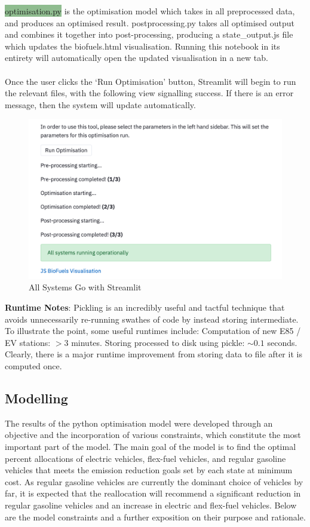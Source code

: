 \documentclass[answers]{exam}
\begin{document}
\begin{outline}
\2 \colorbox{darkseagreen}{optimisation.py} is the optimisation model which takes in all preprocessed data, and produces an optimised result.
\2 \colorbox{babyblue}{postprocessing.py} takes all optimised output and combines it together into post-processing, producing a \colorbox{mediumlavendermagenta}{state\_output.js} file which updates the \colorbox{lilac}{biofuels.html} visualisation. Running this notebook in its entirety will automatically open the updated visualisation in a new tab.
\\ ~\\
Once the user clicks the `Run Optimisation' button, Streamlit will begin to run the relevant files, with the following view signalling success. If there is an error message, then the system will update automatically.
\begin{figure}[h]
    \centering
    \includegraphics[scale=0.4]{systems.png}
    \caption{All Systems Go with Streamlit}
    \label{fig:my_label}
\end{figure}
\0 \textbf{Runtime Notes}: 
\2 Pickling is an incredibly useful and tactful technique that avoids unnecessarily re-running swathes of code by instead storing intermediate. To illustrate the point, some useful runtimes include:
\3 Computation of new E85 / EV stations: $>3$ minutes.
\3 Storing processed to disk using pickle: $\sim0.1$ seconds.
\2 Clearly, there is a major runtime improvement from storing data to file after it is computed once. 
\end{outline}
\subsection{Modelling}
The results of the python optimisation model were developed through an objective and the incorporation of various constraints, which constitute the most important part of the model. The main goal of the model is to find the optimal percent allocations of electric vehicles, flex-fuel vehicles, and regular gasoline vehicles that meets the emission reduction goals set by each state at minimum cost. As regular gasoline vehicles are currently the dominant choice of vehicles by far, it is expected that the reallocation will recommend a significant reduction in regular gasoline vehicles and an increase in electric and flex-fuel vehicles. Below are the model constraints and a further exposition on their purpose and rationale. 
\end{document}
